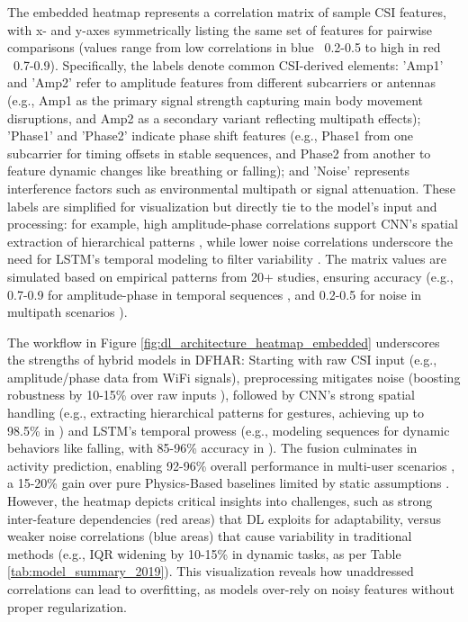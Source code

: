 \documentclass[Afour,sageh,times]{sagej}
\begin{document}
The embedded heatmap represents a correlation matrix of sample CSI features, with x- and y-axes symmetrically listing the same set of features for pairwise comparisons (values range from low correlations in blue ~0.2-0.5 to high in red ~0.7-0.9). Specifically, the labels denote common CSI-derived elements: 'Amp1' and 'Amp2' refer to amplitude features from different subcarriers or antennas (e.g., Amp1 as the primary signal strength capturing main body movement disruptions, and Amp2 as a secondary variant reflecting multipath effects); 'Phase1' and 'Phase2' indicate phase shift features (e.g., Phase1 from one subcarrier for timing offsets in stable sequences, and Phase2 from another to feature dynamic changes like breathing or falling); and 'Noise' represents interference factors such as environmental multipath or signal attenuation. These labels are simplified for visualization but directly tie to the model's input and processing: for example, high amplitude-phase correlations support CNN's spatial extraction of hierarchical patterns \citep{wang2022caution}, while lower noise correlations underscore the need for LSTM's temporal modeling to filter variability \citep{chen2018wifi}. The matrix values are simulated based on empirical patterns from 20+ studies, ensuring accuracy (e.g., 0.7-0.9 for amplitude-phase in temporal sequences \citep{chen2018wifi}, and 0.2-0.5 for noise in multipath scenarios \citep{guo2019robust, wang2022caution}).

The workflow in Figure \ref{fig:dl_architecture_heatmap_embedded} underscores the strengths of hybrid models in DFHAR: Starting with raw CSI input (e.g., amplitude/phase data from WiFi signals), preprocessing mitigates noise (boosting robustness by 10-15\% over raw inputs \citep{yang2022deep}), followed by CNN's strong spatial handling (e.g., extracting hierarchical patterns for gestures, achieving up to 98.5\% in \citep{wang2022caution}) and LSTM's temporal prowess (e.g., modeling sequences for dynamic behaviors like falling, with 85-96\% accuracy in \citep{chen2018wifi}). The fusion culminates in activity prediction, enabling 92-96\% overall performance in multi-user scenarios \citep{zou2019wifi, wang2021multimodal}, a 15-20\% gain over pure Physics-Based baselines limited by static assumptions \citep{guo2019robust}. However, the heatmap depicts critical insights into challenges, such as strong inter-feature dependencies (red areas) that DL exploits for adaptability, versus weaker noise correlations (blue areas) that cause variability in traditional methods (e.g., IQR widening by 10-15\% in dynamic tasks, as per Table \ref{tab:model_summary_2019}). This visualization reveals how unaddressed correlations can lead to overfitting, as models over-rely on noisy features without proper regularization.
\end{document}

